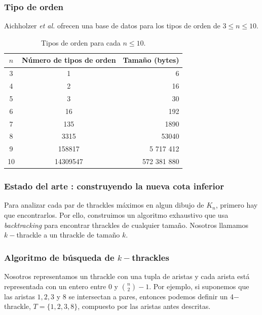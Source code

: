 \begin{frame}
\frametitle{Tipo de orden}
Aichholzer \emph{et al.} ofrecen una base de datos para los tipos de orden de $3 \leq n \leq 10$.
\begin{table}[ht]
	\centering
	\begin{tabular}{|c|c|r|}
		\hline
		$n$ & Número de tipos de orden & Tamaño (bytes)   \\ \hline
		3     & 1                   & 6       \\ \hline
		4     & 2                   & 16      \\ \hline
		5     & 3                   & 30      \\ \hline
		6     & 16                  & 192     \\ \hline
		7     & 135                 & 1890    \\ \hline
		8     & 3315                & 53040   \\ \hline
		9     & 158817              & 5 717 412   \\\hline
		10    & 14309547            & 572 381 880 \\ \hline
	\end{tabular}
	\caption{Tipos de orden para cada $n\leq10$.}
	\label{tab:ots}
\end{table}
\end{frame}
\begin{frame}
\frametitle{Estado del arte : construyendo la nueva cota inferior}
Para analizar cada par de thrackles máximos en algun dibujo de $K_n$, primero hay que encontrarlos. Por ello, construimos un algoritmo 
exhaustivo que usa \emph{backtracking} para encontrar thrackles de cualquier tamaño. Nosotros llamamos $k-$thrackle a un thrackle de tamaño $k$.


\end{frame}
\begin{frame}
\frametitle{Algoritmo de búsqueda de $k-$thrackles}
Nosotros representamos un thrackle con una tupla de aristas y cada arista está representada con un entero entre $0$ y $\binom{n}{2}-1$. Por ejemplo, si suponemos que las aristas $1,2,3$ y $8$ se intersectan a pares, entonces podemos definir un 4$-$thrackle, $T=\{1,2,3,8\}$, compuesto por las aristas antes descritas.\\[10pt]
\end{frame}
